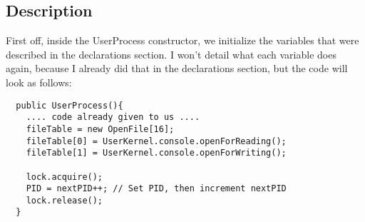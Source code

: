 \documentclass{article}
\begin{document}
\subsection*{Description}
First off, inside the UserProcess constructor, we initialize the variables that
were described in the declarations section. I won't detail what each variable
does again, because I already did that in the declarations section, but the
code will look as follows:
\begin{verbatim}
  public UserProcess(){
    .... code already given to us ....
    fileTable = new OpenFile[16];
    fileTable[0] = UserKernel.console.openForReading();
    fileTable[1] = UserKernel.console.openForWriting();

    lock.acquire();
    PID = nextPID++; // Set PID, then increment nextPID
    lock.release();
  }
\end{verbatim}
\end{document}
